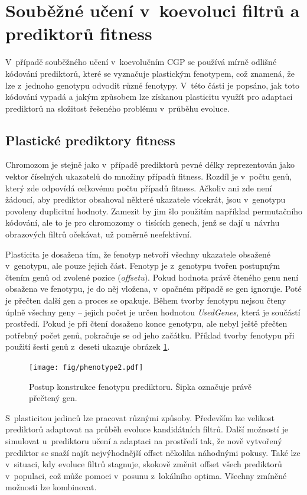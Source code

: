 \section{Souběžné učení v~koevoluci filtrů a prediktorů fitness}
\label{secDesignColearn}

V~případě souběžného učení v~koevolučním CGP se používá mírně odlišné kódování prediktorů, které se vyznačuje plastickým fenotypem, což znamená, že lze z~jednoho genotypu odvodit různé fenotypy. V~této části je popsáno, jak toto kódování vypadá a jakým způsobem lze získanou plasticitu využít pro adaptaci prediktorů na složitost řešeného problému v~průběhu evoluce.

\subsection{Plastické prediktory fitness}
\label{secDesignPred}

Chromozom je stejně jako v~případě prediktorů pevné délky reprezentován jako vektor číselných ukazatelů do množiny případů fitness. Rozdíl je v~počtu genů, který zde odpovídá celkovému počtu případů fitness. Ačkoliv ani zde není žádoucí, aby prediktor obsahoval některé ukazatele vícekrát, jsou v~genotypu povoleny duplicitní hodnoty. Zamezit by jim šlo použitím například permutačního kódování, ale to je pro chromozomy o~tisících genech, jenž se dají u~návrhu obrazových filtrů očekávat, už poměrně neefektivní.

Plasticita je dosažena tím, že fenotyp netvoří všechny ukazatele obsažené v~genotypu, ale pouze jejich část. Fenotyp je z~genotypu tvořen postupným čtením genů od zvolené pozice (\emph{offsetu}). Pokud hodnota právě čteného genu není obsažena ve fenotypu, je do něj vložena, v~opačném případě se gen ignoruje. Poté je přečten další gen a proces se opakuje. Během tvorby fenotypu nejsou čteny úplně všechny geny -- jejich počet je určen hodnotou \emph{UsedGenes}, která je součástí prostředí. Pokud je při čtení dosaženo konce genotypu, ale nebyl ještě přečten potřebný počet genů, pokračuje se od jeho začátku. Příklad tvorby fenotypu při použití šesti genů z~deseti ukazuje obrázek \ref{obrFenotyp}.

\begin{figure}[htb]
    \centering\texttt{[image: fig/phenotype2.pdf]}
    \caption{Postup konstrukce fenotypu prediktoru. Šipka označuje právě přečtený gen.}
    \label{obrFenotyp}
\end{figure}

S~plasticitou jedinců lze pracovat různými způsoby. Především lze velikost prediktorů adaptovat na průběh evoluce kandidátních filtrů. Další možností je simulovat u~prediktoru učení a adaptaci na prostředí tak, že nově vytvořený prediktor se snaží najít nejvýhodnější offset několika náhodnými pokusy. Také lze v~situaci, kdy evoluce filtrů stagnuje, skokově změnit offset všech prediktorů v~populaci, což může pomoci v~posunu z~lokálního optima. Všechny zmíněné možnosti lze kombinovat.

